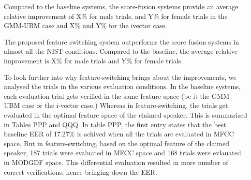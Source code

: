 \documentclass{article}
\begin{document}

Compared to the baseline systems, the score-fusion systems provide an average
relative improvement of X\% for male trials, and Y\% for female trials in the
GMM-UBM case and X\% and Y\% for the ivector case. 




The proposed feature switching system outperforms the score fusion systems in
almost all the NIST conditions. Compared to the baseline, the average relative
improvement is X\% for male trials and Y\% for female trials.

To look further into why feature-switching brings about the improvements, we
analysed the trials in the various evaluation conditions. In the baseline
systems, each evaluation trial gets verified in the same feature space (be it
the GMM-UBM case or the i-vector case.) Whereas in feature-switching, the trials
get evaluated in the optimal feature space of the claimed speaker. This is
summarised in Tables PPP and QQQ. %
In table PPP, the first entry states that the best baseline EER of 17.27\% is achived when
all the trials are evaluated in MFCC space. But in feature-switching, based on
the optimal feature of the claimed speaker, 187 trials were evaluated in MFCC
space and 168 trials were evlauated in MODGDF space. This differential
evaluation resulted in more number of correct verifications, hence bringing down
the EER.
\end{document}
